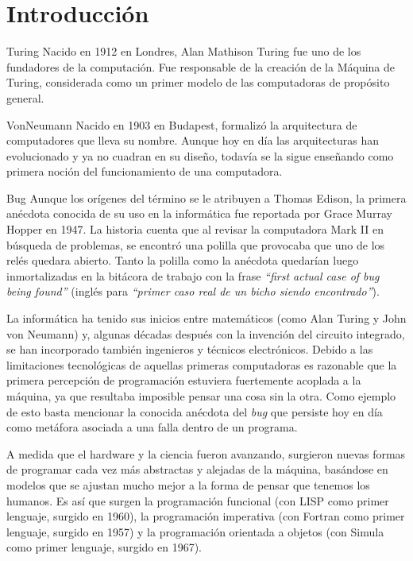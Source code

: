 
\newcommand{\caracteristica}[1]{\item \textbf{#1:}}

\section{Introducción}

\sepfootnotecontent
  {Turing}
  {Nacido en 1912 en Londres, Alan Mathison Turing fue uno de los fundadores de la computación. Fue responsable de la creación de la Máquina de Turing, considerada como un primer modelo de las computadoras de propósito general.}

\sepfootnotecontent
  {VonNeumann}
  {Nacido en 1903 en Budapest, formalizó la arquitectura de computadores que lleva su nombre. Aunque hoy en día las arquitecturas han evolucionado y ya no cuadran en su diseño, todavía se la sigue enseñando como primera noción del funcionamiento de una computadora.}

\sepfootnotecontent
  {Bug}
  {Aunque los orígenes del término se le atribuyen a Thomas Edison, la primera anécdota conocida de su uso en la informática fue reportada por Grace Murray Hopper en 1947. La historia cuenta que al revisar la computadora Mark II en búsqueda de problemas, se encontró una polilla que provocaba que uno de los relés quedara abierto. Tanto la polilla como la anécdota quedarían luego inmortalizadas en la bitácora de trabajo con la frase \textit{``first actual case of bug being found''} (inglés para \textit{``primer caso real de un bicho siendo encontrado''}).}

La informática ha tenido sus inicios entre matemáticos (como Alan Turing y John von Neumann) y, algunas décadas después con la invención del circuito integrado, se han incorporado también ingenieros y técnicos electrónicos. Debido a las limitaciones tecnológicas de aquellas primeras computadoras es razonable que la primera percepción de programación estuviera fuertemente acoplada a la máquina, ya que resultaba imposible pensar una cosa sin la otra. Como ejemplo de esto basta mencionar la conocida anécdota del \textit{bug} que persiste hoy en día como metáfora asociada a una falla dentro de un programa.

A medida que el hardware y la ciencia fueron avanzando, surgieron nuevas formas de programar cada vez más abstractas y alejadas de la máquina, basándose en modelos que se ajustan mucho mejor a la forma de pensar que tenemos los humanos. Es así que surgen la programación funcional (con LISP como primer lenguaje, surgido en 1960\cite{Turner}), la programación imperativa (con Fortran como primer lenguaje, surgido en 1957) y la programación orientada a objetos (con Simula como primer lenguaje, surgido en 1967\cite{wegner1990concepts}).

